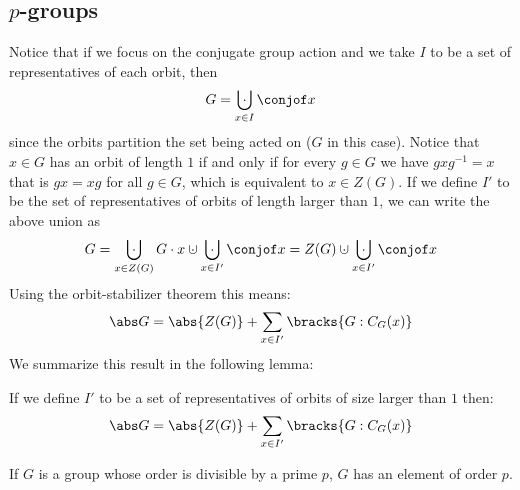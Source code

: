 \documentclass[10pt]{article}
\begin{document}


\bigskip

\subsection{$p$-groups}

Notice that if we focus on the conjugate group action and we take $I$ to be a set of representatives of each orbit, then
\[ G = \bigdcup_{x\in I}\conjof x \]
since the orbits partition the set being acted on ($G$ in this case).
Notice that $x\in G$ has an orbit of length $1$ if and only if for every $g\in G$ we have $gxg^{-1}=x$ that is $gx=xg$ for all $g\in G$, which is equivalent to $x\in Z(G)$.
If we define $I'$ to be the set of representatives of orbits of length larger than $1$, we can write the above union as
\[ G = \bigdcup_{x\in Z(G)}G\cdot x\dcup\bigdcup_{x\in I'}\conjof x = Z(G)\dcup\bigdcup_{x\in I'}\conjof x \]
Using the orbit-stabilizer theorem this means:
\[ \abs G = \abs{Z(G)} + \sum_{x\in I'}\bracks{G : C_G(x)} \]
We summarize this result in the following lemma:

\begin{lemm*}

    If we define $I'$ to be a set of representatives of orbits of size larger than $1$ then:
    \[ \abs G = \abs{Z(G)} + \sum_{x\in I'}\bracks{G : C_G(x)} \]

\end{lemm*}

\begin{thrm*}

    If $G$ is a group whose order is divisible by a prime $p$, $G$ has an element of order $p$.

\end{thrm*}
\end{document}
